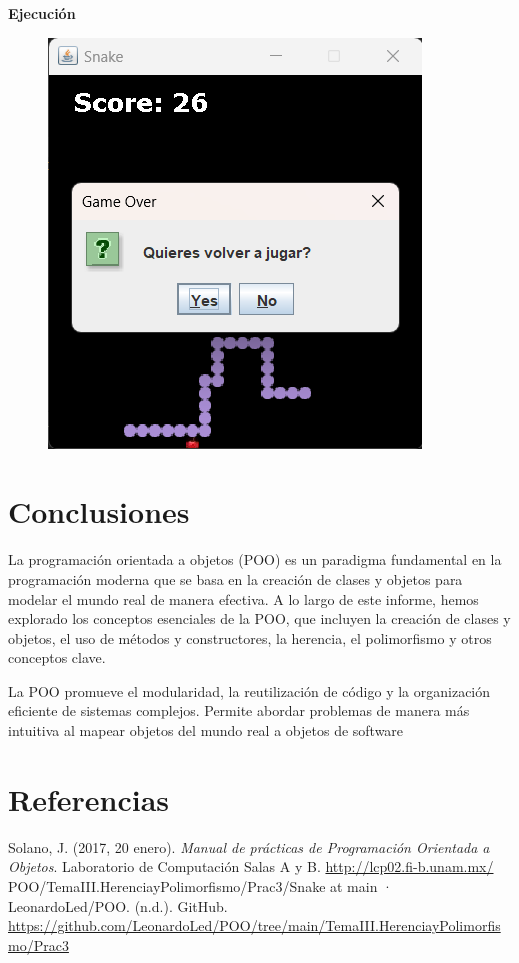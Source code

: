 \documentclass[11pt, twocolumn]{article}
\begin{document}
  \textbf{Ejecución}
  \begin{figure}[ht]
    \includegraphics[width=0.8\columnwidth, center]{P2.png}
  \end{figure}

  \section*{Conclusiones}
  La programación orientada a objetos (POO) es un paradigma fundamental en la programación moderna que se basa en la creación de clases y objetos para modelar el mundo real de manera efectiva. A lo largo de este informe, hemos explorado los conceptos esenciales de la POO, que incluyen la creación de clases y objetos, el uso de métodos y constructores, la herencia, el polimorfismo y otros conceptos clave.

  La POO promueve el modularidad, la reutilización de código y la organización eficiente de sistemas complejos. Permite abordar problemas de manera más intuitiva al mapear objetos del mundo real a objetos de software

  \section*{Referencias}
  \small
  Solano, J. (2017, 20 enero). \textit{Manual de prácticas de Programación Orientada a Objetos}. Laboratorio de Computación Salas A y B. \url{http://lcp02.fi-b.unam.mx/} \\

  POO/TemaIII.HerenciayPolimorfismo/Prac3/Snake at main · LeonardoLed/POO. (n.d.). GitHub. \url{https://github.com/LeonardoLed/POO/tree/main/TemaIII.HerenciayPolimorfismo/Prac3}
\end{document}
